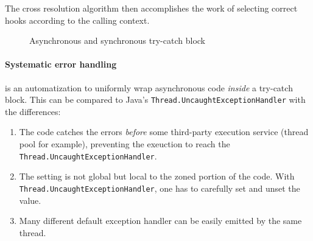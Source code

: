 The cross resolution algorithm then accomplishes the work of selecting correct hooks according to the calling context.

\begin{figure}[H]
\centering
{}
\caption{Asynchronous and synchronous try-catch block}
\label{fig:sas-tc}
\end{figure}

\paragraph{Systematic error handling} is an automatization to uniformly wrap asynchronous code \emph{inside} a try-catch block. This can be compared to Java's \lstinline{Thread.UncaughtExceptionHandler} with the differences:

\begin{enumerate}
\item The code catches the errors \emph{before} some third-party execution service (thread pool for example), preventing the exeuction to reach the \lstinline{Thread.UncaughtExceptionHandler}.
\item The setting is not global but local to the zoned portion of the code. With \lstinline{Thread.UncaughtExceptionHandler}, one has to carefully set and unset the value.
\item Many different default exception handler can be easily emitted by the same thread.
\end{enumerate}

